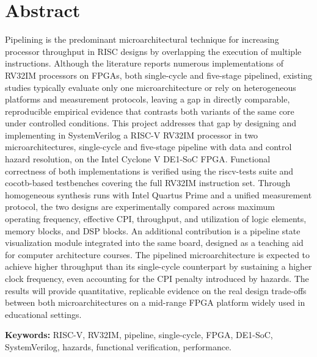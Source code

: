 \section{Abstract}

Pipelining is the predominant microarchitectural technique for increasing processor throughput in RISC designs by overlapping the execution of multiple instructions. Although the literature reports numerous implementations of RV32IM processors on FPGAs, both single-cycle and five-stage pipelined, existing studies typically evaluate only one microarchitecture or rely on heterogeneous platforms and measurement protocols, leaving a gap in directly comparable, reproducible empirical evidence that contrasts both variants of the same core under controlled conditions.
This project addresses that gap by designing and implementing in SystemVerilog a RISC-V RV32IM processor in two microarchitectures, single-cycle and five-stage pipeline with data and control hazard resolution, on the Intel Cyclone V DE1-SoC FPGA. Functional correctness of both implementations is verified using the riscv-tests suite and cocotb-based testbenches covering the full RV32IM instruction set. Through homogeneous synthesis runs with Intel Quartus Prime and a unified measurement protocol, the two designs are experimentally compared across maximum operating frequency, effective CPI, throughput, and utilization of logic elements, memory blocks, and DSP blocks. An additional contribution is a pipeline state visualization module integrated into the same board, designed as a teaching aid for computer architecture courses.
The pipelined microarchitecture is expected to achieve higher throughput than its single-cycle counterpart by sustaining a higher clock frequency, even accounting for the CPI penalty introduced by hazards. The results will provide quantitative, replicable evidence on the real design trade-offs between both microarchitectures on a mid-range FPGA platform widely used in educational settings.

\textbf{Keywords:} RISC-V, RV32IM, pipeline, single-cycle, FPGA, DE1-SoC, SystemVerilog, hazards, functional verification, performance.